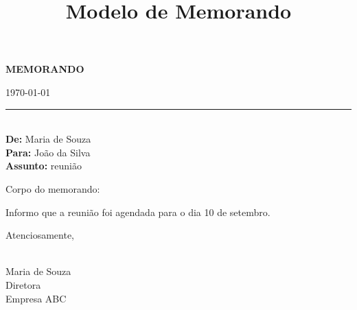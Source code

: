 \documentclass[a4paper,12pt]{article}
\title{Modelo de Memorando}
\author{}
\date{}
\begin{document}
\begin{center}
    \textbf{MEMORANDO}
\end{center}

\bigskip

\begin{flushright}
    \today \\
    \rule{5cm}{0.4pt} \\
    \textbf{De:} Maria de Souza \\
    \textbf{Para:} João da Silva \\
    \textbf{Assunto:} reunião
\end{flushright}

\bigskip

Corpo do memorando:

\bigskip

Informo que a reunião foi agendada para o dia 10 de setembro.

\bigskip

Atenciosamente,

\bigskip

\hrulefill \\
Maria de Souza \\
Diretora \\
Empresa ABC
\end{document}

